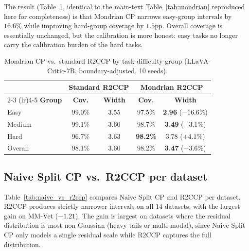 \documentclass{article}
\begin{document}
The result (Table~\ref{tab:mondrian_app}, identical to the main-text Table~\ref{tab:mondrian} reproduced here for completeness) is that Mondrian CP narrows easy-group intervals by $16.6\%$ while improving hard-group coverage by $1.5$pp. Overall coverage is essentially unchanged, but the calibration is more honest: easy tasks no longer carry the calibration burden of the hard tasks.

\begin{table}[t]
\centering
\caption{Mondrian CP vs.\ standard R2CCP by task-difficulty group (LLaVA-Critic-7B, boundary-adjusted, 10 seeds).}
\label{tab:mondrian_app}
\small
\begin{tabular}{lcccc}
\toprule
& \multicolumn{2}{c}{\textbf{Standard R2CCP}} & \multicolumn{2}{c}{\textbf{Mondrian R2CCP}} \\
\cmidrule(lr){2-3} \cmidrule(lr){4-5}
\textbf{Group} & \textbf{Cov.} & \textbf{Width} & \textbf{Cov.} & \textbf{Width} \\
\midrule
Easy & 99.0\% & 3.55 & 97.5\% & \textbf{2.96} ($-16.6\%$) \\
Medium & 99.1\% & 3.60 & 98.7\% & \textbf{3.49} ($-3.1\%$) \\
Hard & 96.7\% & 3.63 & \textbf{98.2\%} & 3.78 ($+4.1\%$) \\
\midrule
Overall & 98.1\% & 3.60 & 98.2\% & \textbf{3.47} ($-3.6\%$) \\
\bottomrule
\end{tabular}
\end{table}

\subsection{Naive Split CP vs.\ R2CCP per dataset}
\label{app:naive_vs_r2ccp}

Table~\ref{tab:naive_vs_r2ccp} compares Naive Split CP and R2CCP per dataset. R2CCP produces strictly narrower intervals on all $14$ datasets, with the largest gain on MM-Vet ($-1.21$). The gain is largest on datasets where the residual distribution is most non-Gaussian (heavy tails or multi-modal), since Naive Split CP only models a single residual scale while R2CCP captures the full distribution.
\end{document}
